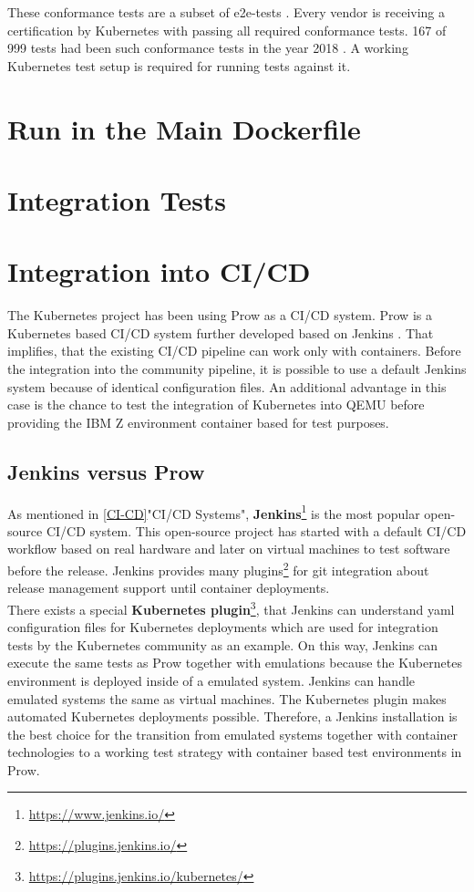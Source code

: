 These conformance tests are a subset of e2e-tests \cite[~p.8]{Omichi2018}. Every vendor is receiving a certification by Kubernetes with passing all required conformance tests. 167 of 999 tests had been such conformance tests in the year 2018 \cite[~p.9]{Omichi2018}.
A working Kubernetes test setup is required for running tests against it.

\section{Run in the Main Dockerfile}

\section{Integration Tests}

\section{Integration into CI/CD}

The Kubernetes project has been using Prow as a CI/CD system. Prow is a Kubernetes based CI/CD system further developed based on Jenkins \cite{JAXenter}. That implifies, that the existing CI/CD pipeline can work only with containers.
Before the integration into the community pipeline, it is possible to use a default Jenkins system because of identical configuration files. An additional advantage in this case is the chance to test the integration of Kubernetes into QEMU before providing the IBM Z environment container based for test purposes.

\subsection{Jenkins versus Prow}

As mentioned in \ref{CI-CD}"CI/CD Systems", \textbf{Jenkins}\footnote{\url{https://www.jenkins.io/}} is the most popular open-source CI/CD system. This open-source project has started with a default CI/CD workflow based on real hardware and later on virtual machines to test software before the release. Jenkins provides many plugins\footnote{\url{https://plugins.jenkins.io/}} for git integration about release management support until container deployments. \\
There exists a special \textbf{Kubernetes plugin}\footnote{\url{https://plugins.jenkins.io/kubernetes/}}, that Jenkins can understand yaml configuration files for Kubernetes deployments which are used for integration tests by the Kubernetes community as an example. On this way, Jenkins can execute the same tests as Prow together with emulations because the Kubernetes environment is deployed inside of a emulated system. Jenkins can handle emulated systems the same as virtual machines. The Kubernetes plugin makes automated Kubernetes deployments possible. Therefore, a Jenkins installation is the best choice for the transition from emulated systems together with container technologies to a working test strategy with container based test environments in Prow.

